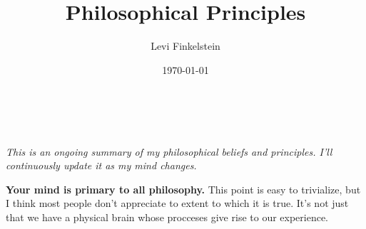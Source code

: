 \title{Philosophical Principles}
\author{Levi Finkelstein}
\date{\today}


\maketitle
\\\\
\it{This is an ongoing summary of my philosophical beliefs and principles. I'll continuously update it as my mind changes.}
\par
\textbf{Your mind is primary to all philosophy.} This point is easy to trivialize, but I think most people don't appreciate to extent to which it is true. It's not just that we have a physical brain whose procceses give rise to our experience.


